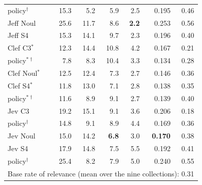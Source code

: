 \begin{table}[t]
\begin{tabular}{lrrrrrr}
\quad policy$^\dagger$ & 15.3 & 5.2 & 5.9 & 2.5 & 0.195 & 0.46 \\
Jeff Noul & 25.6 & 11.7 & 8.6 & \textbf{2.2} & 0.253 & 0.56 \\
Jeff S4 & 15.3 & 14.1 & 9.7 & 2.3 & 0.196 & 0.40 \\
Clef C3$^\ast$ & 12.3 & 14.4 & 10.8 & 4.2 & 0.167 & 0.21 \\
\quad policy$^{\ast\dagger}$ & 7.8 & 8.3 & 10.4 & 3.3 & 0.134 & 0.28 \\
Clef Noul$^\ast$ & 12.5 & 12.4 & 7.3 & 2.7 & 0.146 & 0.36 \\
Clef S4$^\ast$ & 11.8 & 13.0 & 7.1 & 2.8 & 0.138 & 0.35 \\
\quad policy$^{\ast\dagger}$ & 11.6 & 8.9 & 9.1 & 2.7 & 0.139 & 0.40 \\
Jev C3 & 19.2 & 15.1 & 9.1 & 3.6 & 0.206 & 0.18 \\
\quad policy$^\dagger$ & 14.8 & 9.1 & 8.9 & 4.4 & 0.169 & 0.36 \\
Jev Noul & 15.0 & 14.2 & \textbf{6.8} & 3.0 & \textbf{0.170} & 0.38 \\
Jev S4 & 17.9 & 14.8 & 7.5 & 5.5 & 0.192 & 0.41 \\
\quad policy$^\dagger$ & 25.4 & 8.2 & 7.9 & 5.0 & 0.240 & 0.55 \\
\midrule
\multicolumn{7}{l}{\footnotesize Base rate of relevance (mean over the nine collections): 0.31} \\
\bottomrule
\end{tabular}
\end{table}